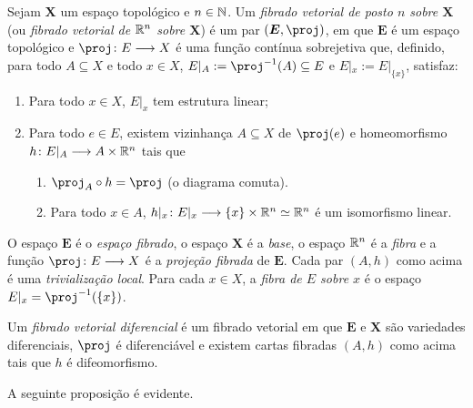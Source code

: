 \begin{defi}
Sejam $\bm X$ um espaço topológico e $n \in \mathbb{N}$. Um \emph{fibrado vetorial de posto $n$ sobre $\bm X$} (ou \emph{fibrado vetorial de $\mathbb{R}^n$ sobre $\bm X$}) é um par $(\bm E,\proj)$, em que $\bm E$ é um espaço topológico e $\proj\colon E \to X$ é uma função contínua sobrejetiva que, definido, para todo $A \subseteq X$ e todo $x \in X$, $E|_A := \proj\inv(A) \subseteq E$ e $E|_x := E|_{\{x\}}$, satisfaz:
	\begin{enumerate}
	\item Para todo $x \in X$, $E|_x$ tem estrutura linear;
	\item Para todo $e \in E$, existem vizinhança $A \subseteq X$ de $\proj(e)$ e homeomorfismo $h\colon E|_A \longrightarrow A \times \mathbb{R}^n$ tais que
		\begin{enumerate}
		\item $\proj_A \circ h = \proj$ (o diagrama comuta).
\begin{figure}
\centering
{}
\end{figure}

		\item Para todo $x \in A$, $h|_x\colon E|_x \longrightarrow \{x\} \times \mathbb{R}^n \simeq \mathbb{R}^n$ é um isomorfismo linear.
		\end{enumerate}
	\end{enumerate}
O espaço $\bm E$ é o \emph{espaço fibrado}, o espaço $\bm X$ é a \emph{base}, o espaço $\mathbb{R}^n$ é a \emph{fibra} e a função $\proj\colon E \to X$ é a \emph{projeção fibrada} de $\bm E$. Cada par $(A,h)$ como acima é uma \emph{trivialização local}. Para cada $x \in X$,  a \emph{fibra de $E$ sobre $x$} é o espaço $E|_x = \proj\inv(\{x\})$.

Um \emph{fibrado vetorial diferencial} é um fibrado vetorial em que $\bm E$ e $\bm X$ são variedades diferenciais, $\proj$ é diferenciável e existem cartas fibradas $(A,h)$ como acima tais que $h$ é difeomorfismo.
\end{defi}

A seguinte proposição é evidente.

